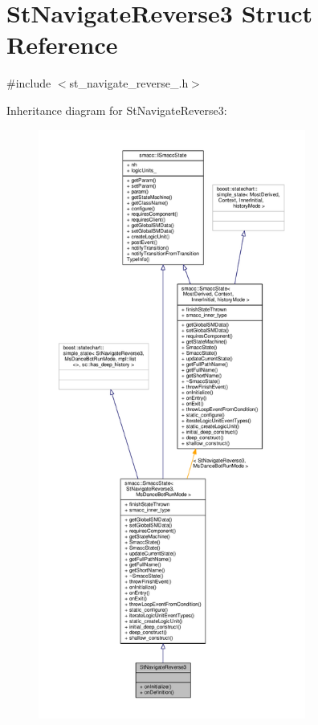 \hypertarget{structStNavigateReverse3}{}\section{St\+Navigate\+Reverse3 Struct Reference}
\label{structStNavigateReverse3}


{\ttfamily \#include $<$st\+\_\+navigate\+\_\+reverse\+\_.\+h$>$}



Inheritance diagram for St\+Navigate\+Reverse3\+:
\nopagebreak
\begin{figure}[H]
\begin{center}
\leavevmode
\includegraphics[height=550pt]{structStNavigateReverse3__inherit__graph}
\end{center}
\end{figure}


